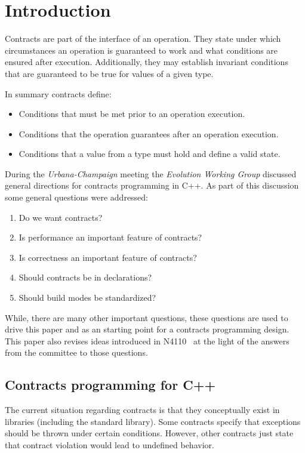 \section{Introduction}

Contracts are part of the interface of an operation. They state under which
circumstances an operation is guaranteed to work and what conditions are
ensured after execution. Additionally, they may establish invariant conditions
that are guaranteed to be true for values of a given type.

In summary contracts define:

\begin{itemize}
\item Conditions that must be met prior to an operation execution.
\item Conditions that the operation guarantees after an operation execution.
\item Conditions that a value from a type must hold and define a valid state.
\end{itemize}

During the \emph{Urbana-Champaign} meeting the \emph{Evolution Working Group} discussed
general directions for contracts programming in C++. As part of this discussion
some general questions were addressed:

\begin{enumerate}
\item Do we want contracts?
\item Is performance an important feature of contracts?
\item Is correctness an important feature of contracts?
\item Should contracts be in declarations?
\item Should build modes be standardized?
\end{enumerate}

While, there are many other important questions, these questions are used to
drive this paper and as an starting point for a contracts programming design.
This paper also revises ideas introduced in N4110~\cite{n4110} at the light of
the answers from the committee to those questions.

\subsection{Contracts programming for C++}

The current situation regarding contracts is that they conceptually exist in
libraries (including the standard library). Some contracts specify that
exceptions should be thrown under certain conditions. However, other contracts
just state that contract violation would lead to undefined behavior.


